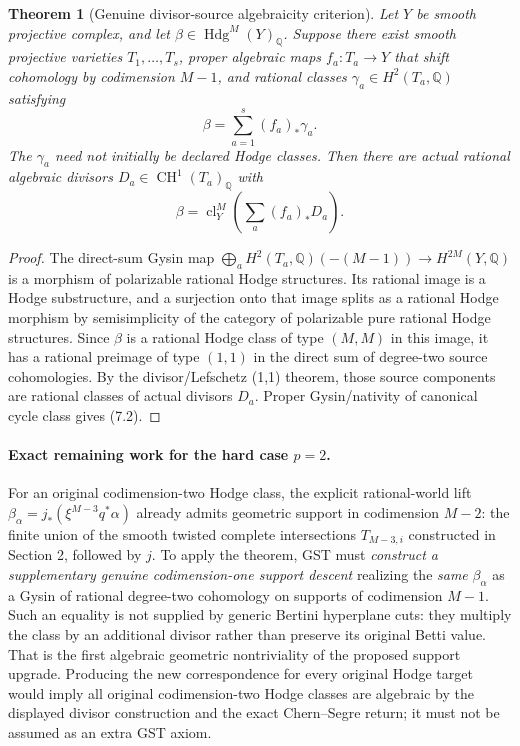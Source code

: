 \documentclass[11pt]{article}
\newcommand{\Q}{\mathbb Q}
\newcommand{\CH}{\operatorname{CH}}
\newcommand{\Hdg}{\operatorname{Hdg}}
\newcommand{\cl}{\operatorname{cl}}
\newtheorem{theorem}{Theorem}[section]
\begin{document}
\begin{theorem}[Genuine divisor-source algebraicity criterion]
Let \(Y\) be smooth projective complex,
and let \(\beta\in\Hdg^M(Y)_\Q\).
Suppose there exist smooth projective
varieties \(T_1,\ldots,T_s\), proper
algebraic maps \(f_a:T_a\to Y\)
that shift cohomology by codimension
\(M-1\), and rational classes
\(\gamma_a\in H^2(T_a,\Q)\) satisfying
\[
 \boxed{\beta=\sum_{a=1}^s(f_a)_*\gamma_a.}
 \tag{7.1}
\]
The \(\gamma_a\) need not initially be
declared Hodge classes. Then there are
\emph{actual rational algebraic divisors}
\(D_a\in\CH^1(T_a)_\Q\)
with
\[
 \boxed{\beta=\cl_Y^M
              \left(\sum_a(f_a)_*D_a\right).}
 \tag{7.2}
\]
\end{theorem}
\begin{proof}
The direct-sum Gysin map
\(\bigoplus_a H^2(T_a,\Q)(-(M-1))
 \to H^{2M}(Y,\Q)\)
is a morphism of polarizable rational
Hodge structures. Its rational image is a
Hodge substructure, and a surjection onto
that image splits as a rational Hodge
morphism by semisimplicity of the
category of polarizable pure rational
Hodge structures. Since \(\beta\) is
a rational Hodge class of type
\((M,M)\) in this image,
it has a rational preimage of type
\((1,1)\) in the direct sum of
degree-two source cohomologies.
By the divisor/Lefschetz (1,1)
theorem, those source components
are rational classes of actual
divisors \(D_a\). Proper
Gysin/nativity of canonical cycle
class gives (7.2).
\end{proof}

\paragraph{Exact remaining work for the hard case \(p=2\).}
For an original codimension-two Hodge
class, the explicit rational-world lift
\(\beta_\alpha=j_*(\xi^{M-3}q^*\alpha)\)
already admits geometric support
in codimension \(M-2\):
the finite union of the smooth twisted
complete intersections \(T_{M-3,i}\)
constructed in Section 2, followed by \(j\).
To apply the theorem, GST must
\emph{construct a supplementary
genuine codimension-one
support descent} realizing the
\emph{same} \(\beta_\alpha\)
as a Gysin of rational degree-two
cohomology on supports of codimension
\(M-1\). Such an equality is
not supplied by generic Bertini
hyperplane cuts: they multiply the
class by an additional divisor
rather than preserve its
original Betti value.
That is the first algebraic
geometric nontriviality of the
proposed support upgrade.
Producing the new correspondence
for every original Hodge target
would imply all original
codimension-two Hodge classes
are algebraic by the displayed
divisor construction and the exact
Chern--Segre return; it must not
be assumed as an extra GST axiom.
\end{document}
